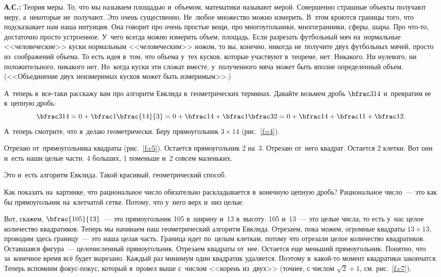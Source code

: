 \textbf{А.С.:} Теория меры. То, что мы называем площадью и~объемом, математики называют мерой.
Совершенно страшные объекты получают меру, а~некоторые не~получают. Это очень существенно. Не~любое
множество можно измерить. В~этом кроются границы того, что подсказывает нам наша интуиция. Она говорит про
очень простые вещи, про многоугольники, многогранники, сферы, шары. Про что-то, достаточно просто
устроенное. У~чего всегда можно измерить объем, площадь. Если разрезать футбольный мяч
на~нормальные <<человеческие>> куски нормальным <<человеческим>> ножом, то вы, конечно, никогда
не~получите двух футбольных мячей, просто из~соображений объема. То есть идея в~том, что объема
у~тех кусков, которые участвуют в~теореме, нет. Никакого. Ни нулевого, ни положительного, никакого
нет. Но~когда куски эти сложат вместе, у~полученного мяча может быть вполне определенный объем.
(<<Объединение двух неизмеримых кусков может быть измеримым>>.)

А~теперь я~все-таки расскажу вам про алгоритм Евклида в~геометрических терминах. Давайте возьмем
дробь $\bfrac3{14}$ и~превратим ее в~цепную дробь:
$$
\bfrac3{14} =
0 + \bfrac1{\bfrac{14}{3}} =
0 + \bfrac1{4 + \bfrac1{\bfrac32}} =
0 + \bfrac1{4 + \bfrac1{1 + \bfrac12}}.
$$
А~теперь смотрите, что я~делаю геометрически. Беру прямоугольник $3\times14$ (рис.~\ref{f:c4}).



Отрезаю от~прямоугольника квадраты (рис.~\ref{f:c5}). Остается прямоугольник 2 на~3. Отрезаю
от~него квадрат. Остается 2 клетки. Вот они и~есть наши целые части. 4 больших, 1 поменьше и~2
совсем маленьких.

Это и~есть алгоритм Евклида. Такой красивый, геометрический способ.

Как показать на~картинке, что рациональное число обязательно раскладывается в~конечную цепную
дробь? Рациональное число~--- это как бы прямоугольник на~клетчатой сетке. Потому, что у~него верх и~низ
целые.

Вот, скажем, $\bfrac{105}{13}$~--- это прямоугольник 105 в~ширину и~13 в~высоту.
105 и~13~--- это целые числа, то есть у~нас целое количество квадратиков. Теперь мы начинаем наш
геометрический алгоритм Евклида. Отрезаем, пока можем, огромные квадраты $13\times13$, проводим здесь
границу~--- это наша целая часть. Граница идет по~целым клеткам, потому что отрезали целое
количество квадратиков. Оставшаяся фигура~--- целочисленный прямоугольник. Отрезаем квадраты
от~нее. Остается еще меньший прямоугольник. Понятно, что за~конечное время всё будет вырезано.
Каждый раз минимум один квадратик удаляется. Поэтому в~какой-то момент квадратики закончатся.
Теперь вспомним фокус-покус,
 который я~провел выше с~числом <<корень из~двух>> (точнее, с числом $\sqrt2+1$, см. рис.~\ref{f:c7}).

